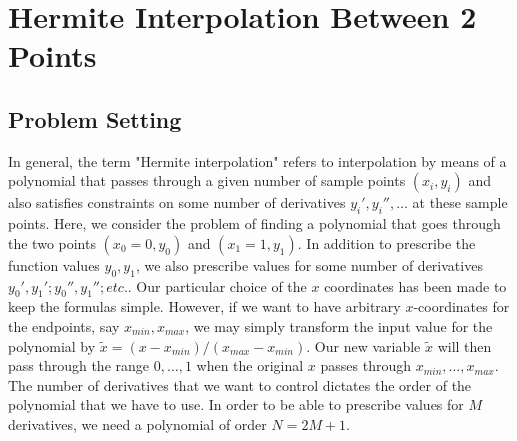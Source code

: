 \section{Hermite Interpolation Between 2 Points}

\subsection{Problem Setting}
In general, the term "Hermite interpolation" refers to interpolation by means of a polynomial that passes through a given number of sample points $(x_i, y_i)$ and also satisfies constraints on some number of derivatives $y_i', y_i'', \ldots$ at these sample points. Here, we consider the problem of finding a polynomial that goes through the two points $(x_0 = 0, y_0)$ and $(x_1 = 1, y_1)$. In addition to prescribe the function values $y_0, y_1$, we also prescribe values for some number of derivatives $y_0', y_1'; y_0'', y_1''; etc.$. Our particular choice of the $x$ coordinates has been made to keep the formulas simple. However, if we want to have arbitrary $x$-coordinates for the endpoints, say $x_{min}, x_{max}$, we may simply transform the input value for the polynomial by $\tilde{x} = (x - x_{min}) / (x_{max} - x_{min})$. Our new variable $\tilde{x}$ will then pass through the range $0, \ldots, 1$ when the original $x$ passes through $x_{min}, \ldots, x_{max}$. The number of derivatives that we want to control dictates the order of the polynomial that we have to use. In order to be able to prescribe values for $M$ derivatives, we need a polynomial of order $N = 2 M + 1$.

